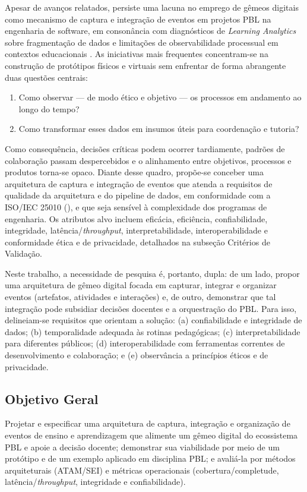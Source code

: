 \documentclass[12pt,a4paper]{article}
\begin{document}
Apesar de avanços relatados, persiste uma lacuna no emprego de gêmeos digitais como mecanismo de captura e integração de eventos em projetos PBL na engenharia de software, em consonância com diagnósticos de \textit{Learning Analytics} sobre fragmentação de dados e limitações de observabilidade processual em contextos educacionais \cite{romero2010, romero2020}. As iniciativas mais frequentes concentram-se na construção de protótipos físicos e virtuais \cite{barricelli2019} sem enfrentar de forma abrangente duas questões centrais:
\begin{enumerate}
  \item Como observar — de modo ético e objetivo — os processos em andamento ao longo do tempo?
  \item Como transformar esses dados em insumos úteis para coordenação e tutoria?
\end{enumerate}
Como consequência, decisões críticas podem ocorrer tardiamente, padrões de colaboração passam despercebidos e o alinhamento entre objetivos, processos e produtos torna-se opaco. Diante desse quadro, propõe-se conceber uma arquitetura de captura e integração de eventos que atenda a requisitos de qualidade da arquitetura e do pipeline de dados, em conformidade com a ISO/IEC 25010 (\cite{iso25010}), e que seja sensível à complexidade dos programas de engenharia. Os atributos alvo incluem eficácia, eficiência, confiabilidade, integridade, latência/\textit{throughput}, interpretabilidade, interoperabilidade e conformidade ética e de privacidade, detalhados na subseção Critérios de Validação.

Neste trabalho, a necessidade de pesquisa é, portanto, dupla: de um lado, propor uma arquitetura de gêmeo digital focada em capturar, integrar e organizar eventos (artefatos, atividades e interações) e, de outro, demonstrar que tal integração pode subsidiar decisões docentes e a orquestração do PBL. Para isso, delineiam-se requisitos que orientam a solução: (a) confiabilidade e integridade de dados; (b) temporalidade adequada às rotinas pedagógicas; (c) interpretabilidade para diferentes públicos; (d) interoperabilidade com ferramentas correntes de desenvolvimento e colaboração; e (e) observância a princípios éticos e de privacidade.

\subsection{Objetivo Geral}

Projetar e especificar uma arquitetura de captura, integração e organização de eventos de ensino e aprendizagem que alimente um gêmeo digital do ecossistema PBL e apoie a decisão docente; demonstrar sua viabilidade por meio de um protótipo e de um exemplo aplicado em disciplina PBL; e avaliá-la por métodos arquiteturais (ATAM/SEI) e métricas operacionais (cobertura/completude, latência/\textit{throughput}, integridade e confiabilidade).
\end{document}
